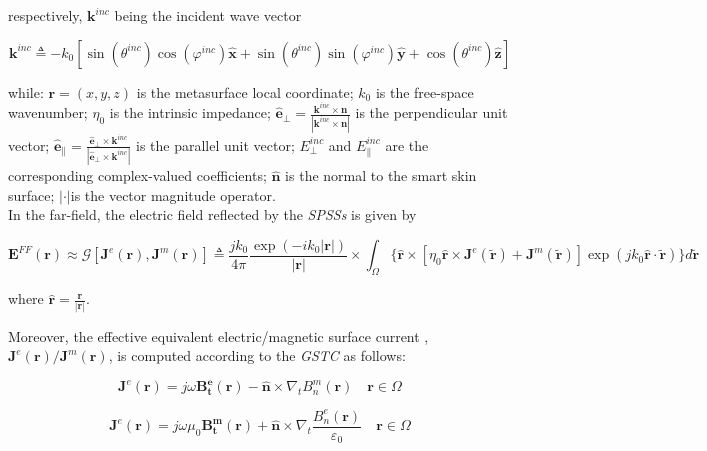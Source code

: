 respectively, $\mathbf{k}^{inc}$ being the incident wave vector 

\begin{equation}
\mathbf{k}^{inc}\triangleq-k_{0}[\sin(\theta^{inc})\cos(\varphi^{inc})\mathbf{\hat{x}}+\sin(\theta^{inc})\sin(\varphi^{inc})\mathbf{\hat{y}}+\cos(\theta^{inc})\mathbf{\hat{z}}]\label{eq:3}\end{equation}


while: $\mathbf{r}=(x,y,z)$ is the metasurface local coordinate; $k_{0}$ is the free-space wavenumber; $\eta_{0}$ is the intrinsic impedance; $\mathbf{\hat{e}}_{\perp}=\frac{\mathbf{k}^{inc}\times\mathbf{\hat{n}}}{|\mathbf{k}^{inc}\times\mathbf{\hat{n}}|}$ is the perpendicular unit vector; $\mathbf{\hat{e}}_{\parallel}=\frac{\mathbf{\hat{e}}_{\perp}\times\mathbf{k}^{inc}}{|\mathbf{\hat{e}}_{\perp}\times\mathbf{k}^{inc}|}$ is the parallel unit vector; $E_{\perp}^{inc}$ and $E_{\parallel}^{inc}$ are the corresponding complex-valued coefficients; $\mathbf{\hat{n}}$ is the normal to the smart skin surface; $\mathbf{|\cdot|}$is the vector magnitude operator.\\
In the far-field, the electric field reflected by the \emph{SPSSs}
is given by

\begin{equation}
\mathbf{E}^{FF}(\mathbf{r})\approx\mathcal{G}[\mathbf{J}^{e}(\mathbf{r}),\mathbf{J}^{m}(\mathbf{r})]\triangleq\frac{jk_{0}}{4\pi}\frac{\exp(-ik_{0}|\mathbf{r}|)}{|\mathbf{r}|}\times\int_{\Omega}\{\mathbf{\hat{r}}\times[\eta_{0}\mathbf{\hat{r}}\times\mathbf{J}^{e}(\tilde{\mathbf{r}})+\mathbf{J}^{m}(\mathbf{\tilde{r}})]\exp(jk_{0}\mathbf{\hat{r}}\cdot\mathbf{\tilde{r}})\} d\mathbf{\tilde{r}}\label{eq:4}\end{equation}


where $\mathbf{\hat{r}}=\frac{\mathbf{r}}{|\mathbf{r}|}$.

Moreover, the effective equivalent electric/magnetic surface current
, $\mathbf{J}^{e}(\mathbf{r})/\mathbf{J}^{m}(\mathbf{r})$, is computed
according to the \emph{GSTC} as follows:

\begin{equation}
\mathbf{J}^{e}(\mathbf{r})=j\omega\mathbf{B_{t}^{e}}(\mathbf{r})-\mathbf{\hat{n}}\times\nabla_{t}B_{n}^{m}(\mathbf{r})\quad\mathbf{r}\in\Omega\label{eq:5}\end{equation}


\begin{equation}
\mathbf{J}^{e}(\mathbf{r})=j\omega\mu_{0}\mathbf{B_{t}^{m}}(\mathbf{r})+\mathbf{\hat{n}}\times\nabla_{t}\frac{B_{n}^{e}(\mathbf{r})}{\varepsilon_{0}}\quad\mathbf{r}\in\Omega\label{eq:6}\end{equation}


